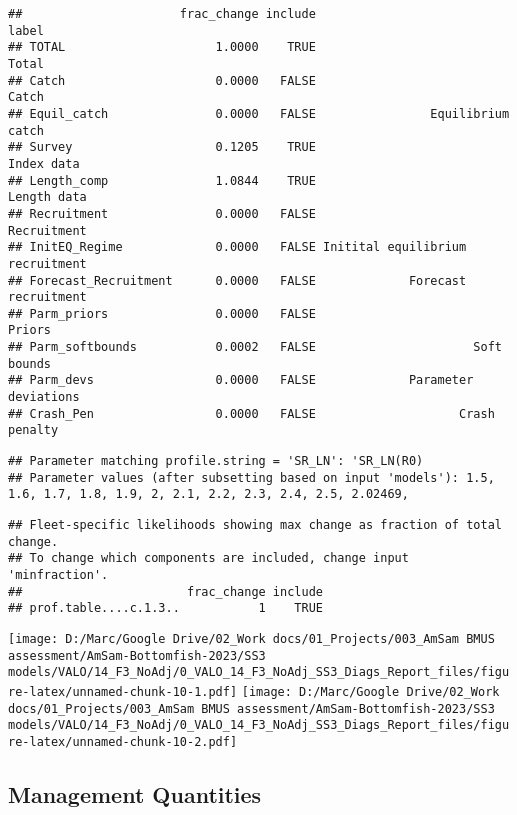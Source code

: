 \documentclass[
]{article}
\begin{document}
\begin{verbatim}
##                      frac_change include                            label
## TOTAL                     1.0000    TRUE                            Total
## Catch                     0.0000   FALSE                            Catch
## Equil_catch               0.0000   FALSE                Equilibrium catch
## Survey                    0.1205    TRUE                       Index data
## Length_comp               1.0844    TRUE                      Length data
## Recruitment               0.0000   FALSE                      Recruitment
## InitEQ_Regime             0.0000   FALSE Initital equilibrium recruitment
## Forecast_Recruitment      0.0000   FALSE             Forecast recruitment
## Parm_priors               0.0000   FALSE                           Priors
## Parm_softbounds           0.0002   FALSE                      Soft bounds
## Parm_devs                 0.0000   FALSE             Parameter deviations
## Crash_Pen                 0.0000   FALSE                    Crash penalty
\end{verbatim}

\begin{verbatim}
## Parameter matching profile.string = 'SR_LN': 'SR_LN(R0)
## Parameter values (after subsetting based on input 'models'): 1.5, 1.6, 1.7, 1.8, 1.9, 2, 2.1, 2.2, 2.3, 2.4, 2.5, 2.02469,
\end{verbatim}

\begin{verbatim}
## Fleet-specific likelihoods showing max change as fraction of total change.
## To change which components are included, change input 'minfraction'.
##                       frac_change include
## prof.table....c.1.3..           1    TRUE
\end{verbatim}

\texttt{[image: D:/Marc/Google Drive/02\_Work docs/01\_Projects/003\_AmSam BMUS assessment/AmSam-Bottomfish-2023/SS3 models/VALO/14\_F3\_NoAdj/0\_VALO\_14\_F3\_NoAdj\_SS3\_Diags\_Report\_files/figure-latex/unnamed-chunk-10-1.pdf]}
\texttt{[image: D:/Marc/Google Drive/02\_Work docs/01\_Projects/003\_AmSam BMUS assessment/AmSam-Bottomfish-2023/SS3 models/VALO/14\_F3\_NoAdj/0\_VALO\_14\_F3\_NoAdj\_SS3\_Diags\_Report\_files/figure-latex/unnamed-chunk-10-2.pdf]}

\hypertarget{management-quantities}{%
\subsection{Management Quantities}\label{management-quantities}}
\end{document}

